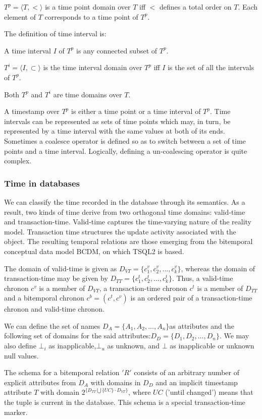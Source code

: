 $T^p=\langle T,< \rangle$ is a time point domain over $T$ iff $<$ defines a total order on $T$. Each element of $T$ corresponds to a time point of $T^p$.

The definition of time interval is:

A time interval $I$ of $T^p$ is any connected subset of $T^p$.

$T^i = \langle I,\subset \rangle $ is the time interval domain over $T^p$ iff $I$ is the set of all the intervals of $T^p$.

Both $T^p$ and $T^i$ are time domains over $T$.

A timestamp over $T^p$ is either a time point or a time interval of $T^p$. Time intervals can be represented as sets of time points which may, in turn, be represented by a time interval with the same values at both of its ends. Sometimes a coalesce operator is defined so as to switch between a set of time points and a time interval. Logically, defining a un-coalescing operator is quite complex. 
\subsubsection{\label{subsubsec:timeDb}Time in databases}
We can classify the time recorded in the database through its semantics. As a result, two kinds of time derive from two orthogonal time domains: valid-time and transaction-time. Valid-time captures the time-varying nature of the reality model. Transaction time structures the update activity associated with the object. The resulting temporal relations are those emerging from the bitemporal conceptual data model BCDM, on which TSQL2 is based.

The domain of valid-time is given as $D_{VT}=\lbrace{c_1^v,c_2^v,...,c_k^v}\rbrace$, whereas the domain of transaction-time may be given by $D_{TT}=\lbrace{c_1^t,c_2^t,...,c_k^t}\rbrace$. Thus, a valid-time chronon $c^v$  is a member of $D_{VT}$, a transaction-time chronon $c^t$ is a member of $D_{TT}$ and a bitemporal chronon $c^b=(c^t,c^v)$ is an ordered pair of a transaction-time chronon and valid-time chronon.

We can define the set of names $D_A=\lbrace{A_1,A_2,...,A_n}\rbrace$as attributes and the following set of domains for the said attributes:$D_D=\lbrace{D_1,D_2,...,D_n}\rbrace$. We may also define $\bot_i$ as inapplicable,$\bot_u$ as unknown, and $\bot$ as inapplicable or unknown null values. 

The schema for a bitemporal relation $'R'$ consists of an arbitrary number of explicit attributes from $D_A$ with domains in $D_D$ and an implicit timestamp attribute $T$ with domain $2^{\lbrace D_{TT}\bigcup \lbrace UC \rbrace \cdot D_{VT}\rbrace}$, where $UC$ ('until changed') means that the tuple is current in the database. This schema is a special transaction-time marker.


